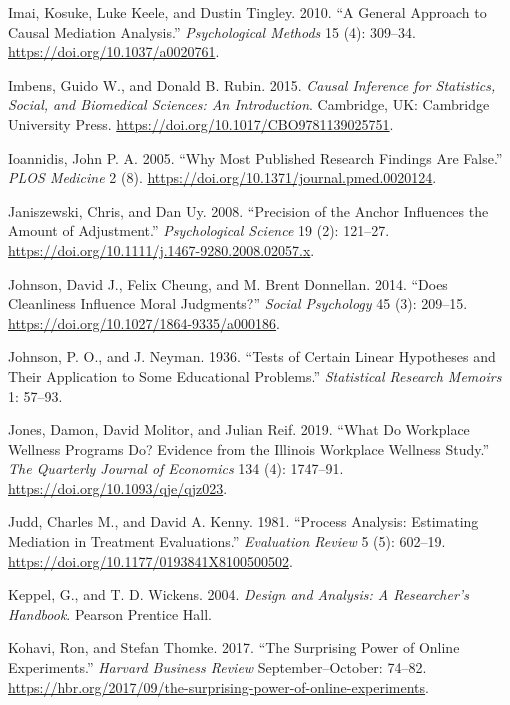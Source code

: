 \documentclass[
  11pt,
  letterpaper,
]{scrbook}
\newlength{\cslhangindent}
\newenvironment{CSLReferences}[2] %
 {\begin{list}{}{%
  \setlength{\itemindent}{0pt}
  \setlength{\leftmargin}{0pt}
  \setlength{\parsep}{0pt}
  \ifodd #1
   \setlength{\leftmargin}{\cslhangindent}
   \setlength{\itemindent}{-1\cslhangindent}
  \fi
  \setlength{\itemsep}{#2\baselineskip}}}
 {\end{list}}
\theoremstyle{definition}
\theoremstyle{definition}
\theoremstyle{remark}
\begin{document}
\begin{CSLReferences}{1}{0}
Imai, Kosuke, Luke Keele, and Dustin Tingley. 2010. {``A General
Approach to Causal Mediation Analysis.''} \emph{Psychological Methods}
15 (4): 309--34. \url{https://doi.org/10.1037/a0020761}.

Imbens, Guido W., and Donald B. Rubin. 2015. \emph{Causal Inference for
Statistics, Social, and Biomedical Sciences: An Introduction}.
Cambridge, UK: Cambridge University Press.
\url{https://doi.org/10.1017/CBO9781139025751}.

Ioannidis, John P. A. 2005. {``Why Most Published Research Findings Are
False.''} \emph{PLOS Medicine} 2 (8).
\url{https://doi.org/10.1371/journal.pmed.0020124}.

Janiszewski, Chris, and Dan Uy. 2008. {``Precision of the Anchor
Influences the Amount of Adjustment.''} \emph{Psychological Science} 19
(2): 121--27. \url{https://doi.org/10.1111/j.1467-9280.2008.02057.x}.

Johnson, David J., Felix Cheung, and M. Brent Donnellan. 2014. {``Does
Cleanliness Influence Moral Judgments?''} \emph{Social Psychology} 45
(3): 209--15. \url{https://doi.org/10.1027/1864-9335/a000186}.

Johnson, P. O., and J. Neyman. 1936. {``Tests of Certain Linear
Hypotheses and Their Application to Some Educational Problems.''}
\emph{Statistical Research Memoirs} 1: 57--93.

Jones, Damon, David Molitor, and Julian Reif. 2019. {``What Do Workplace
Wellness Programs Do? Evidence from the {I}llinois Workplace Wellness
Study.''} \emph{The Quarterly Journal of Economics} 134 (4): 1747--91.
\url{https://doi.org/10.1093/qje/qjz023}.

Judd, Charles M., and David A. Kenny. 1981. {``Process Analysis:
Estimating Mediation in Treatment Evaluations.''} \emph{Evaluation
Review} 5 (5): 602--19.
\url{https://doi.org/10.1177/0193841X8100500502}.

Keppel, G., and T. D. Wickens. 2004. \emph{Design and Analysis: A
Researcher's Handbook}. Pearson Prentice Hall.

Kohavi, Ron, and Stefan Thomke. 2017. {``The Surprising Power of Online
Experiments.''} \emph{Harvard Business Review} September--October:
74--82.
\url{https://hbr.org/2017/09/the-surprising-power-of-online-experiments}.


\end{CSLReferences}
\end{document}
